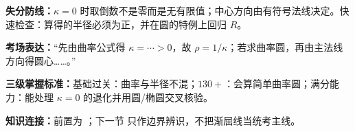 \begin{knowledgeBox}
\textbf{失分防线：}\(\kappa=0\) 时取倒数不是零而是无有限值；中心方向由有符号法线决定。快速检查：算得的半径必须为正，并在圆的特例上回归 \(R\)。

\textbf{考场表达：}“先由曲率公式得 \(\kappa=\cdots>0\)，故 \(\rho=1/\kappa\)；若求曲率圆，再由主法线方向得圆心……。”

\textbf{三级掌握标准：}基础过关：曲率与半径不混；\(130+\)：会算简单曲率圆；满分能力：能处理 \(\kappa=0\) 的退化并用圆/椭圆交叉核验。

\textbf{知识连接：}前置为 ；下一节 只作边界辨识，不把渐屈线当统考主线。
\end{knowledgeBox}


\par

